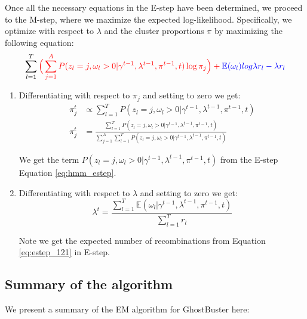 Once all the necessary equations in the E-step have been determined, we proceed to the M-step, where we maximize the expected log-likelihood. Specifically, we optimize with respect to $\lambda$ and the cluster proportions $\pi$ by maximizing the following equation:
\begin{equation}
    \sum\limits_{l=1}^{T}  \color{red}{ \Big( \sum\limits_{j=1}^{A} P(z_l = j, \omega_l > 0 \vert \gamma^{t-1}, \lambda^{t-1}, \pi^{t-1}, t) \log \pi_j} \Big) + \color{blue}{\mathbb{E}(\omega_l) log \lambda r_l - \lambda r_l }
\end{equation}

\begin{enumerate}
    \item Differentiating with respect to $\pi_j$ and setting to zero we get:  
    \begin{align}
        \pi^{t}_j &\propto \sum\limits_{l=1}^{T} P(z_l = j, \omega_l > 0 \vert \gamma^{t-1}, \lambda^{t-1}, \pi^{t-1}, t) \nonumber \\
        \pi^{t}_j &= \frac{\sum\limits_{l=1}^{T} P(z_l = j, \omega_l > 0 \vert \gamma^{t-1}, \lambda^{t-1}, \pi^{t-1}, t)}{\sum\limits_{j=1}^{A} \sum\limits_{l=1}^{T} P(z_l = j, \omega_l > 0 \vert \gamma^{t-1}, \lambda^{t-1}, \pi^{t-1}, t)}
    \label{eq:pi_updates}
    \end{align}
    
    We get the term $P(z_l = j, \omega_l > 0 \vert \gamma^{t-1}, \lambda^{t-1}, \pi^{t-1}, t)$ from the E-step Equation \ref{eq:hmm_estep}. 
    \item Differentiating with respect to $\lambda$ and setting to zero we get:
    \begin{equation}
        \lambda^t = \frac{\sum\limits_{l=1}^{T}\mathbb{E}(\omega_l \vert \gamma^{t-1}, \lambda^{t-1}, \pi^{t-1}, t)}{\sum\limits_{l=1}^{T}r_l}
    \label{eq:lambda_updates}
    \end{equation}
    
    Note we get the expected number of recombinations from Equation \ref{eq:estep_121} in E-step.
    
\end{enumerate}

\clearpage

\subsection{Summary of the algorithm}
We present a summary of the EM algorithm for GhostBuster here:

